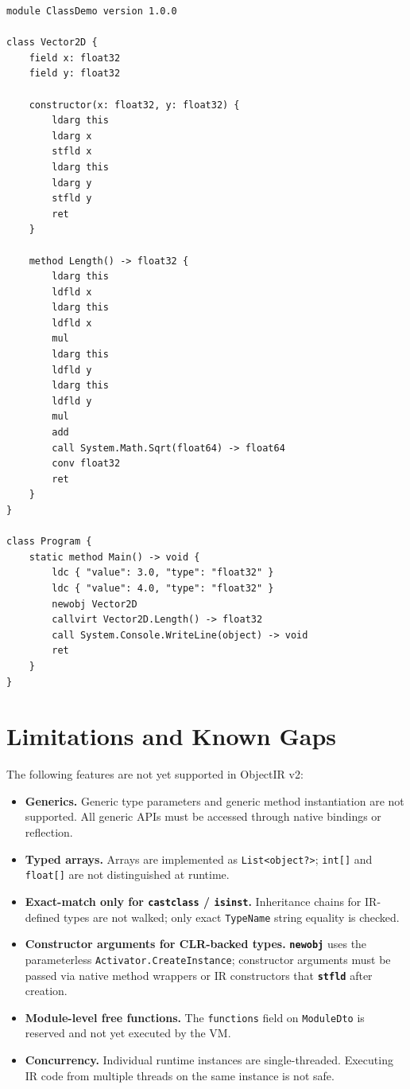\documentclass[11pt,a4paper]{article}
\newcommand{\code}[1]{\texttt{\small #1}}
\newcommand{\typename}[1]{\textcolor{typecolor}{\texttt{\small #1}}}
\newcommand{\opcode}[1]{\textbf{\texttt{#1}}}
\begin{document}
\begin{lstlisting}[style=textir, caption={Instance class with constructor}]
module ClassDemo version 1.0.0

class Vector2D {
    field x: float32
    field y: float32

    constructor(x: float32, y: float32) {
        ldarg this
        ldarg x
        stfld x
        ldarg this
        ldarg y
        stfld y
        ret
    }

    method Length() -> float32 {
        ldarg this
        ldfld x
        ldarg this
        ldfld x
        mul
        ldarg this
        ldfld y
        ldarg this
        ldfld y
        mul
        add
        call System.Math.Sqrt(float64) -> float64
        conv float32
        ret
    }
}

class Program {
    static method Main() -> void {
        ldc { "value": 3.0, "type": "float32" }
        ldc { "value": 4.0, "type": "float32" }
        newobj Vector2D
        callvirt Vector2D.Length() -> float32
        call System.Console.WriteLine(object) -> void
        ret
    }
}
\end{lstlisting}

\section{Limitations and Known Gaps}

\begin{warnbox}
The following features are not yet supported in ObjectIR v2:
\end{warnbox}

\begin{itemize}[leftmargin=1.8em]
  \item \textbf{Generics.} Generic type parameters and generic method
    instantiation are not supported. All generic APIs must be accessed
    through native bindings or reflection.
  \item \textbf{Typed arrays.} Arrays are implemented as
    \code{List<object?>}; \texttt{int[]} and \texttt{float[]} are not
    distinguished at runtime.
  \item \textbf{Exact-match only for \opcode{castclass} / \opcode{isinst}.}
    Inheritance chains for IR-defined types are not walked; only exact
    \code{TypeName} string equality is checked.
  \item \textbf{Constructor arguments for CLR-backed types.} \opcode{newobj}
    uses the parameterless \code{Activator.CreateInstance}; constructor
    arguments must be passed via native method wrappers or IR constructors
    that \opcode{stfld} after creation.
  \item \textbf{Module-level free functions.} The \code{functions} field on
    \typename{ModuleDto} is reserved and not yet executed by the VM.
  \item \textbf{Concurrency.} Individual runtime instances are single-threaded.
    Executing IR code from multiple threads on the same instance is not safe.
\end{itemize}
\end{document}
